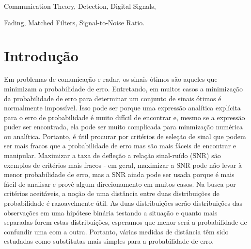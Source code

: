 \documentclass{sbrt2017port}
\begin{document}
\begin{keywords}
Communication Theory, Detection, Digital Signals,

Fading, Matched Filters, Signal-to-Noise Ratio.
\end{keywords}

\section{Introdução} \label{sec1}

Em problemas de comunicação e radar, os sinais ótimos são aqueles que minimizam a probabilidade de erro.
 Entretando, em muitos casos a minimização da probabilidade de erro para determinar um conjunto de sinais ótimos é normalmente impossível.
Isso pode ser porque uma expressão analítica explícita para o erro de probabilidade é muito difícil de encontrar e, mesmo se a expressão puder ser encontrada, ela pode ser muito complicada para minmização numérica ou analítica.
Portanto, é útil procurar por critérios de seleção de sinal que podem ser mais fracos que a probabilidade de erro mas são mais fáceis de encontrar e manipular.
Maximizar a taxa de defleção a relação sinal-ruído (SNR) são exemplos de critérios mais fracos - em geral, maximizar a SNR pode não levar à menor probabilidade de erro, mas a SNR ainda pode ser usada porque é mais fácil de analisar e provê algum direcionamento em muitos casos.
Na busca por critérios aceitáveis, a noção de uma distância entre duas distribuições de probabilidade é razoavelmente útil.
As duas distribuições serão distribuições das observações em uma hipótese binária testando a situação e quanto mais separadas forem estas distribuições, esperamos que menor será a probabilidade de confundir uma com a outra. Portanto, várias medidas de distância têm sido estudadas como substitutas mais simples para a probabilidade de erro.
\end{document}
